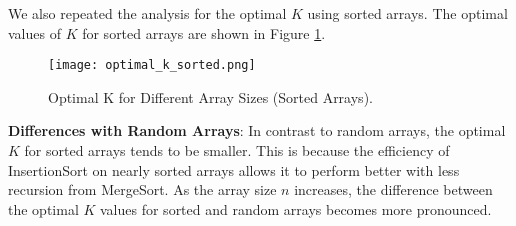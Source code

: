 \documentclass{article}
\begin{document}
	We also repeated the analysis for the optimal \( K \) using sorted arrays. The optimal values of \( K \) for sorted arrays are shown in Figure \ref{fig:optimal_k_sorted}.
	
	\begin{figure}[h]
		\centering
		\texttt{[image: optimal\_k\_sorted.png]}
		\caption{Optimal K for Different Array Sizes (Sorted Arrays).}
		\label{fig:optimal_k_sorted}
	\end{figure}
	
	\textbf{Differences with Random Arrays}: In contrast to random arrays, the optimal \( K \) for sorted arrays tends to be smaller. This is because the efficiency of InsertionSort on nearly sorted arrays allows it to perform better with less recursion from MergeSort. As the array size \( n \) increases, the difference between the optimal \( K \) values for sorted and random arrays becomes more pronounced.
	
\end{document}
